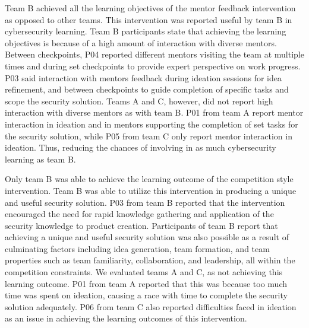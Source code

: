 \documentclass[runningheads]{llncs}
\begin{document}
Team B achieved all the learning objectives of the mentor feedback intervention as opposed to other teams. This intervention was reported useful by team B in cybersecurity learning. Team B participants state that achieving the learning objectives is because of a high amount of interaction with diverse mentors. Between checkpoints, P04 reported different mentors visiting the team at multiple times and during set checkpoints to provide expert perspective on work progress. P03 said interaction with mentors feedback during ideation sessions for idea refinement, and between checkpoints to guide completion of specific tasks and scope the security solution. 
Teams A and C, however, did not report high interaction with diverse mentors as with team B. 
P01 from team A report mentor interaction in ideation and in mentors supporting the completion of set tasks for the security solution, while P05 from team C only report mentor interaction in ideation. Thus, reducing the chances of involving in as much cybersecurity learning as team B.

Only team B was able to achieve the learning outcome of the competition style intervention. Team B was able to utilize this intervention in producing a unique and useful security solution. 
P03 from team B reported that the intervention encouraged the need for rapid knowledge gathering and application of the security knowledge to product creation.
Participants of team B report that achieving a unique and useful security solution was also possible as a result of culminating factors including idea generation, team formation, and team properties such as team familiarity, collaboration, and leadership, all within the competition constraints. 
We evaluated teams A and C, as not achieving this learning outcome. P01 from team A reported that this was because too much time was spent on ideation, causing a race with time to complete the security solution adequately. P06 from team C also reported difficulties faced in ideation as an issue in achieving the learning outcomes of this intervention.
\end{document}
